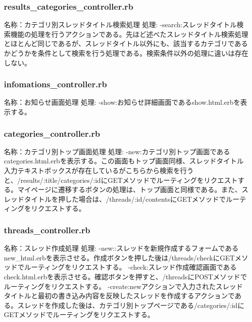 \documentclass[a4j]{jarticle}
\begin{document}
\subsubsection{results\_categories\_controller.rb}
\noindent 名称：カテゴリ別スレッドタイトル検索処理 \newline
処理:\newline
-search:スレッドタイトル検索機能の処理を行うアクションである。先ほど述べたスレッドタイトル検索処理とほとんど同じであるが、スレッドタイトル以外にも、該当するカテゴリであるかどうかを条件として検索を行う処理である。検索条件以外の処理に違いは存在しない。\newline



\subsubsection{infomations\_controller.rb}
\noindent 名称：お知らせ画面処理 \newline
処理:\newline
-show:お知らせ詳細画面であるshow.html.erbを表示する。\newline



\subsubsection{categories\_controller.rb}
\noindent 名称：カテゴリ別トップ画面処理 \newline
処理:\newline
-new:カテゴリ別トップ画面であるcategories.html.erbを表示する。この画面もトップ画面同様、スレッドタイトル入力テキストボックスが存在しているがこちらから検索を行うと、/results/:title/categories/:idにGETメソッドでルーティングをリクエストする。マイページに遷移するボタンの処理は、トップ画面と同様である。また、スレッドタイトルを押した場合は、/threads/:id/contentsにGETメソッドでルーティングをリクエストする。\newline



\subsubsection{threads\_controller.rb}
\noindent 名称：スレッド作成処理 \newline
処理:\newline
-new::スレッドを新規作成するフォームであるnew\_html.erbを表示させる。作成ボタンを押した後は/threads/checkにGETメソッドでルーティングをリクエストする。\newline
-check:スレッド作成確認画面であるcheck.html.erbを表示させる。確認ボタンを押すと、/threadsにPOSTメソッドでルーティングをリクエストする。\newline
-create:newアクションで入力されたスレッドタイトルと最初の書き込み内容を反映したスレッドを作成するアクションである。スレッドを作成した後は、カテゴリ別トップページである/categories/:idにGETメソッドでルーティングをリクエストする。
\end{document}

